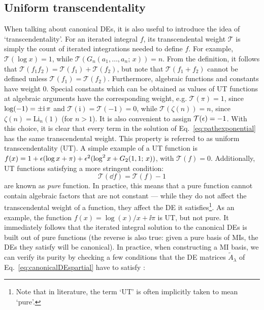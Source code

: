 \documentclass[main.tex]{subfiles}
\begin{document}
\subsection{Uniform transcendentality} \label{sec:UT}
When talking about canonical DEs, it is also useful to introduce the idea of `transcendentality'. For an iterated integral $f$, its transcendental weight $\mathcal{T}$ is simply the count of iterated integrations needed to define $f$\cite{Henn:2013pwa}. For example, $\mathcal{T}(\log x) = 1$, while $\mathcal{T}(G_n(a_1, \ldots, a_n;\, x)) = n$. From the definition, it follows that $\mathcal{T}(f_1 f_2) = \mathcal{T}(f_1) + \mathcal{T}(f_2)$, but note that $\mathcal{T}(f_1 + f_2)$ cannot be defined unless $\mathcal{T}(f_1) = \mathcal{T}(f_2)$. Furthermore, algebraic functions and constants have weight 0. Special constants which can be obtained as values of UT functions at algebraic arguments have the corresponding weight, e.g. $\mathcal{T}(\pi) = 1$, since $\log (-1) = \pm \mathrm{i}\, \pi$ and $\mathcal{T}(\mathrm{i}) = \mathcal{T}(-1) = 0$, while $\mathcal{T}(\zeta(n)) = n$, since $\zeta(n) = \text{Li}_n(1)$ (for $n>1$). It is also convenient to assign $\mathcal{T}(\epsilon)=-1$. With this choice, it is clear that every term in the solution of Eq.~\ref{eq:pathexponential} has the same transcendental weight. This property is referred to as uniform transcendentality (UT). A simple example of a UT function is $f(x) = 1 + \epsilon (\log x + \pi) + \epsilon^2 (\log^2 x + G_2(1, 1;\, x))$, with $\mathcal{T}(f) = 0$. Additionally, 
UT functions satisfying a more stringent condition:
\begin{equation} \label{eq:purecondition}
    \mathcal{T}(\dd f) = \mathcal{T}(f) - 1
\end{equation}
are known as \textit{pure} function. In practice, this means that a pure function cannot contain algebraic factors that are not constant --- while they do not affect the transcendental weight of a function, they affect the DE it satisfies\footnote{Note that in literature, the term `UT' is often implicitly taken to mean `pure'.}. As an example, the function $f(x) = \log(x)/x + \ii \pi$ is UT, but not pure. It immediately follows that the iterated integral solution to the canonical DEs is built out of pure functions (the reverse is also true: given a pure basis of MIs, the DEs they satisfy will be canonical). In practice, when constructing a MI basis, we can verify its purity by checking a few conditions that the DE matrices $\tilde{A}_\lambda$ of Eq.~\ref{eq:canonicalDEspartial} have to satisfy :
\end{document}

